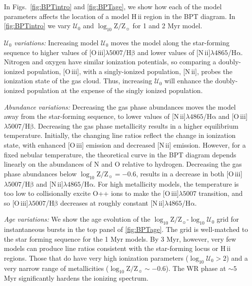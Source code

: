 \documentclass[trackchanges, twocolumn, tighten]{aastex61}
\newcommand{\Fig}[1]{\autoref{fig:#1}}
\newcommand{\logten}{\ensuremath{\log_{10}}}
\newcommand{\nii}{[N\,{\sc ii}]\xspace}
\newcommand{\oiii}{[O\,{\sc iii}]\xspace}
\newcommand{\ha}{\ensuremath{\mathrm{H\alpha}}}
\newcommand{\hb}{\ensuremath{\mathrm{H\beta}}}
\newcommand{\hii}{H\,{\sc ii}\xspace}
\newcommand\lam[1]{\ensuremath{\lambda #1}}
\newcommand{\logz}{\ensuremath{\logten \mathrm{Z}/\mathrm{Z}_{\sun}}}
\newcommand{\logZeq}[1]{\ensuremath{\logten \mathrm{Z}/\mathrm{Z}_{\sun} = #1}}
\newcommand{\U}{\ensuremath{\mathcal{U}_{0}}}
\newcommand{\logU}{\ensuremath{\logten \mathcal{U}_0}}
\newcommand\niiha{\nii{}\lam{4865}/\ha{}}
\newcommand\oiiihb{\oiii{}\lam{5007}/\hb{}}
\begin{document}
In Figs.~\ref{fig:BPTintro} and \ref{fig:BPTage}, we show how each of the model parameters affects the location of a model \hii region in the BPT diagram. In \Fig{BPTintro} we vary \U{} and \logz{} for 1 and 2 Myr model.

{\it \U{} variations:} Increasing model \U{} moves the model along the star-forming sequence to higher values of \oiiihb{} and lower values of \niiha{}. Nitrogen and oxygen have similar ionization potentials, so comparing a doubly-ionized population, \oiii{}, with a singly-ionized population, \nii{}, probes the ionization state of the gas cloud. Thus, increasing \U{} will enhance the doubly-ionized population at the expense of the singly ionized population.

{\it Abundance variations:} Decreasing the gas phase abundances moves the model away from the star-forming sequence, to lower values of \niiha{} and \oiiihb{}. Decreasing the gas phase metallicity results in a higher equilibrium temperature. Initially, the changing line ratios reflect the change in ionization state, with enhanced \oiii{} emission and decreased \nii{} emission. However, for a fixed nebular temperature, the theoretical curve in the BPT diagram depends linearly on the abundances of N and O relative to hydrogen. Decreasing the gas phase abundances below \logZeq{-0.6},  results in a decrease in both \oiiihb{} and \niiha{}. For high metallicity models, the temperature is too low to collisionally excite O++ ions to make the \oiii{}\lam{5007} transition, and so \oiiihb{} decreases at roughly constant \niiha{}.

{\it Age variations:} We show the age evolution of the \logz{}-\logU{} grid for instantaneous bursts in the top panel of \Fig{BPTage}. The grid is well-matched to the star forming sequence for the 1 Myr models. By 3 Myr, however, very few models can produce line ratios consistent with the star-forming locus or \hii regions. Those that do have very high ionization parameters ($\logU > 2$) and a very narrow range of metallicities ($\logz \sim -0.6$). The WR phase at $\sim5$ Myr significantly hardens the ionizing spectrum.
\end{document}
